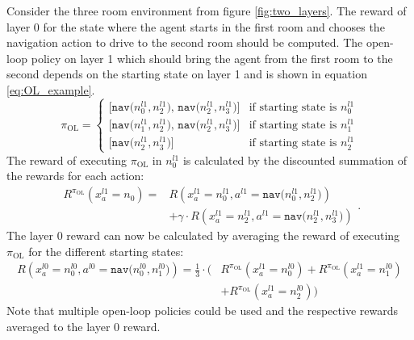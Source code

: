 \begin{example}\label{ex:R_OL}
Consider the three room environment from figure \ref{fig:two_layers}. The reward of layer 0 for the state where the agent starts in the first room and chooses the navigation action to drive to the second room should be computed. The open-loop policy on layer 1 which should bring the agent from the first room to the second depends on the starting state on layer 1 and is shown in equation \ref{eq:OL_example}.
\begin{equation}\label{eq:OL_example}
    \pi_\text{OL} = \begin{cases}
    \texttt{[nav($n_0^{l1}, n_2^{l1}$), nav($n_2^{l1}, n_3^{l1}$)]} & \text{if starting state is }n_0^{l1}\\
    \texttt{[nav($n_1^{l1}, n_2^{l1}$), nav($n_2^{l1}, n_3^{l1}$)]} & \text{if starting state is }n_1^{l1}\\
    \texttt{[nav($n_2^{l1}, n_3^{l1}$)]} & \text{if starting state is }n_2^{l1}
    \end{cases}
\end{equation}
The reward of executing $\pi_\text{OL}$ in $n_0^{l1}$ is calculated by the discounted summation of the rewards for each action:
\begin{equation}
    \begin{aligned}
    R^{\pi_\text{OL}}\left(x_a^{l1}=n_0\right)=
    &R\left(x_a^{l1}=n_0^{l1}, a^{l1}=\texttt{nav($n_0^{l1}, n_2^{l1}$)} \right) \\
    &+ \gamma \cdot R\left(x_a^{l1}=n_2^{l1}, a^{l1}=\texttt{nav($n_2^{l1}, n_3^{l1}$)} \right)
\end{aligned}.
\end{equation}
The layer 0 reward can now be calculated by averaging the reward of executing $\pi_\text{OL}$ for the different starting states:
\begin{equation}
    \begin{aligned}
       R\left(x_a^{l0}=n_0^{l0}, a^{l0}=\texttt{nav($n_0^{l0}, n_1^{l0}$)}\right) = \frac{1}{3}\cdot \big(&R^{\pi_\text{OL}}\left(x_a^{l1}=n_0^{l0}\right) + R^{\pi_\text{OL}}\left(x_a^{l1}=n_1^{l0}\right)\\
       &+ R^{\pi_\text{OL}}\left(x_a^{l1}=n_2^{l0}\right)\big)
    \end{aligned}
\end{equation}
Note that multiple open-loop policies could be used and the respective rewards averaged to the layer 0 reward. 
\demo
\end{example}

